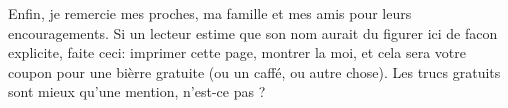\documentclass[ 
11pt, %
french, %
singlespacing, %
parskip, %
headsepline, %
openany, %
]{MastersDoctoralThesis} %
\theoremstyle{plain}
\numberwithin{theorem}{section}  %
\begin{document}
\begin{acknowledgements}
\hspace{12pt} Enfin, je remercie mes proches, ma famille et mes amis pour leurs encouragements. Si un lecteur estime que son nom aurait du figurer ici de facon explicite, faite ceci: imprimer cette page, montrer la moi, et cela sera votre coupon pour une bièrre gratuite (ou un caffé, ou autre chose). Les trucs gratuits sont mieux qu'une mention, n'est-ce pas ?

\end{acknowledgements}


\tableofcontents %




% 
% 


% 
% 
\end{document}
